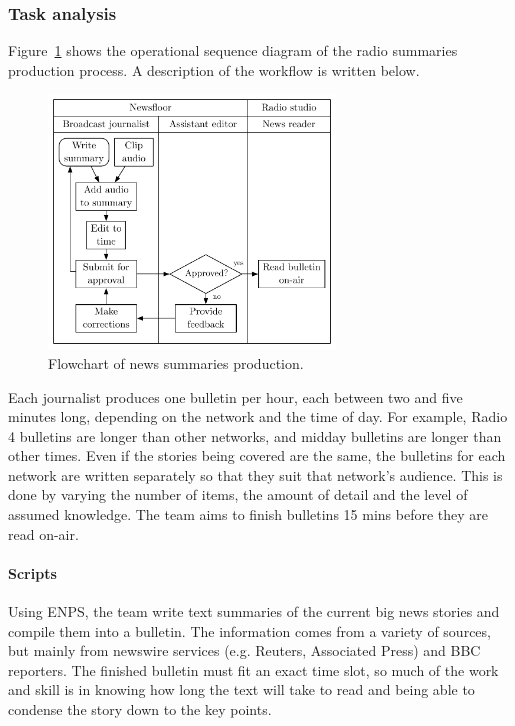 \subsubsection{Task analysis}
Figure~\ref{fig:news-flowchart} shows the operational sequence diagram of the radio summaries production process. A description of the workflow is written below.

\begin{figure}[ht]
	\centering
	\includegraphics[width=3in]{figs/news-workflow.pdf}
	\caption{Flowchart of news summaries production.}
	\label{fig:news-flowchart}
\end{figure}

Each journalist produces one bulletin per hour, each between two and five minutes long, depending on the network and the time of day. For example, Radio 4 bulletins are longer than other networks, and midday bulletins are longer than other times. Even if the stories being covered are the same, the bulletins for each network are written separately so that they suit that network's audience. This is done by varying the number of items, the amount of detail and the level of assumed knowledge. The team aims to finish bulletins 15 mins before they are read on-air.

\paragraph{Scripts}
Using ENPS, the team write text summaries of the current big news stories and compile them into a bulletin. The
information comes from a variety of sources, but mainly from newswire services (e.g. Reuters, Associated Press) and BBC reporters.  The finished bulletin must fit an exact time slot, so much of the work and skill is in knowing how long the text will take to read and being able to condense the story down to the key points. 

